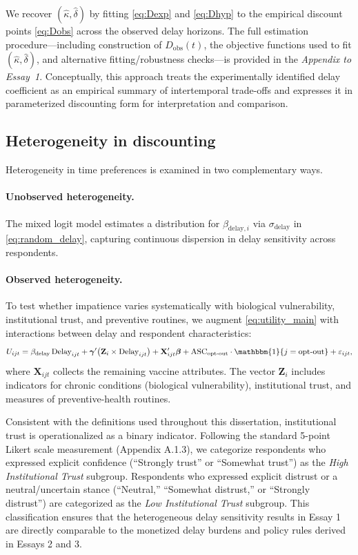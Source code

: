 We recover $(\hat{\kappa},\hat{\delta})$ by fitting \eqref{eq:Dexp} and \eqref{eq:Dhyp} to the empirical discount points \eqref{eq:Dobs} across the observed delay horizons. The full estimation procedure---including construction of $D_{\text{obs}}(t)$, the objective functions used to fit $(\hat{\kappa},\hat{\delta})$, and alternative fitting/robustness checks---is provided in the \textit{Appendix to Essay~1}. Conceptually, this approach treats the experimentally identified delay coefficient as an empirical summary of intertemporal trade-offs and expresses it in parameterized discounting form for interpretation and comparison.

\subsection*{Heterogeneity in discounting}
Heterogeneity in time preferences is examined in two complementary ways.

\paragraph{Unobserved heterogeneity.}
The mixed logit model estimates a distribution for $\beta_{\text{delay},i}$ via $\sigma_{\text{delay}}$ in \eqref{eq:random_delay}, capturing continuous dispersion in delay sensitivity across respondents.

\paragraph{Observed heterogeneity.}
To test whether impatience varies systematically with biological vulnerability, institutional trust, and preventive routines, we augment \eqref{eq:utility_main} with interactions between delay and respondent characteristics:
\begin{equation}
U_{ijt} = \beta_{\text{delay}} \, \text{Delay}_{ijt} + \boldsymbol{\gamma}'\!\left(\mathbf{Z}_i \times \text{Delay}_{ijt}\right) + \mathbf{X}_{ijt}'\boldsymbol{\beta} + \text{ASC}_{\text{opt-out}} \cdot \mathbbm{1}\{j=\text{opt-out}\} + \varepsilon_{ijt},
\label{eq:heterogeneity}
\end{equation}
where $\mathbf{X}_{ijt}$ collects the remaining vaccine attributes. The vector $\mathbf{Z}_i$ includes indicators for chronic conditions (biological vulnerability), institutional trust, and measures of preventive-health routines. 

Consistent with the definitions used throughout this dissertation, institutional trust is operationalized as a binary indicator. Following the standard 5-point Likert scale measurement (Appendix A.1.3), we categorize respondents who expressed explicit confidence (``Strongly trust'' or ``Somewhat trust'') as the \textit{High Institutional Trust} subgroup. Respondents who expressed explicit distrust or a neutral/uncertain stance (``Neutral,'' ``Somewhat distrust,'' or ``Strongly distrust'') are categorized as the \textit{Low Institutional Trust} subgroup. This classification ensures that the heterogeneous delay sensitivity results in Essay 1 are directly comparable to the monetized delay burdens and policy rules derived in Essays 2 and 3.

